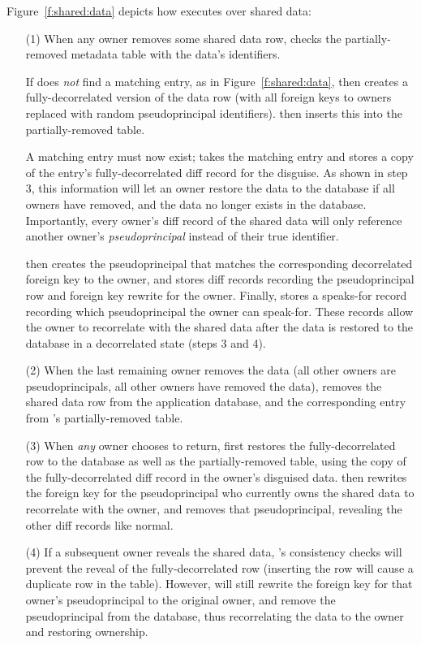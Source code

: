 %
Figure~\ref{f:shared:data} depicts how \sys executes over shared
data:
%
\begin{enumerate}
    \item[(1)] When any owner removes some shared data row, \sys checks the
        partially-removed metadata table with the data's identifiers.
        
        If \sys does \emph{not} find a matching entry, as in
        Figure~\ref{f:shared:data}, then \sys creates a fully-decorrelated
        version of the data row (with all foreign keys to owners replaced with
        random pseudoprincipal identifiers). \sys then inserts this into the
        partially-removed table.

        A matching entry must now exist; \sys takes the matching entry and
        stores a copy of the entry's fully-decorrelated diff record for the
        disguise.  As shown in step 3, this information will let an owner
        restore the data to the database if all owners have removed, and the
        data no longer exists in the database.  Importantly, every owner's diff
        record of the shared data will only reference another owner's
        \emph{pseudoprincipal} instead of their true identifier.

        \sys then creates the pseudoprincipal that matches the corresponding
        decorrelated foreign key to the owner, and stores diff records recording
        the pseudoprincipal row and foreign key rewrite for the owner. Finally,
        \sys stores a speaks-for record recording which pseudoprincipal the
        owner can speak-for. These records allow the owner to recorrelate 
        with the shared data after the data is restored to the database in a
        decorrelated state (steps 3 and 4).

\item[(2)]
        When the last remaining owner removes the data (all other owners are
        pseudoprincipals, \ie all other owners have removed the data), \sys
        removes the shared data row from the application database, and the
        corresponding entry from \sys's partially-removed table.
%

\item[(3)]
When \emph{any} owner chooses to return, \sys first restores the
fully-decorrelated row to the database as well as the partially-removed table,
        using the copy of the fully-decorrelated diff record in
the owner's disguised data.  \sys then rewrites the foreign key for the
pseudoprincipal who currently owns the shared data to recorrelate with the
owner, and removes that pseudoprincipal, revealing the other diff records like
normal. 
%

\item[(4)] If a subsequent owner reveals the shared data, \sys's consistency
    checks will prevent the reveal of the fully-decorrelated row (inserting the
        row will cause a duplicate row in the table). However, \sys will still
        rewrite the foreign key for that owner's pseudoprincipal to the original
        owner, and remove the pseudoprincipal from the database, thus
        recorrelating the data to the owner and restoring ownership.
%
\end{enumerate}

